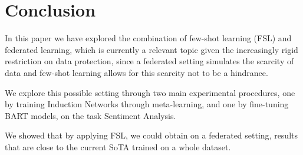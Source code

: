 \documentclass{esannV2}
\begin{document}
    




    \section{Conclusion}
    In this paper we have explored the combination of few-shot learning (FSL) and federated learning, which is currently a relevant topic given the increasingly rigid restriction on data protection, since a federated setting simulates the scarcity of data and few-shot learning allows for this scarcity not to be a hindrance.
    
    We explore this possible setting through two main experimental procedures, one by training Induction Networks through meta-learning, and one by fine-tuning BART models, on the task Sentiment Analysis.
    
    We showed that by applying FSL, we could obtain on a federated setting, results that are close to the current SoTA trained on a whole dataset. 


\begin{footnotesize}




\end{footnotesize}

%
\end{document}
